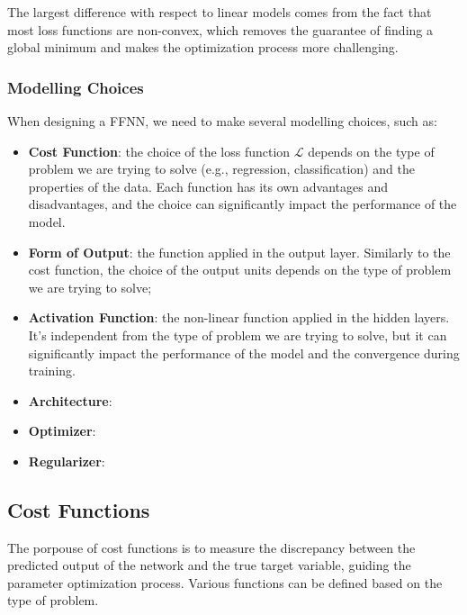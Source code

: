 The largest difference with respect to linear models comes from the fact that most loss functions are non-convex, which removes the guarantee of finding a global minimum and makes the optimization process more challenging.

\subsubsection{Modelling Choices}
When designing a FFNN, we need to make several modelling choices, such as:
\begin{itemize}
    \item \textbf{Cost Function}: the choice of the loss function $\mathcal{L}$ depends on the type of problem we are trying to solve (e.g., regression, classification) and the properties of the data.
    Each function has its own advantages and disadvantages, and the choice can significantly impact the performance of the model.
    \item \textbf{Form of Output}: the function applied in the output layer. Similarly to the cost function, the choice of the output units depends on the type of problem we are trying to solve;
    \item \textbf{Activation Function}: the non-linear function applied in the hidden layers. It's independent from the type of problem we are trying to solve, but it can significantly impact the
    performance of the model and the convergence during training.
    \item \textbf{Architecture}:
    \item \textbf{Optimizer}:
    \item \textbf{Regularizer}:
\end{itemize}

\subsection{Cost Functions}
The porpouse of cost functions is to measure the discrepancy between the predicted output of the network and the true target variable, guiding the parameter optimization process.
Various functions can be defined based on the type of problem.

